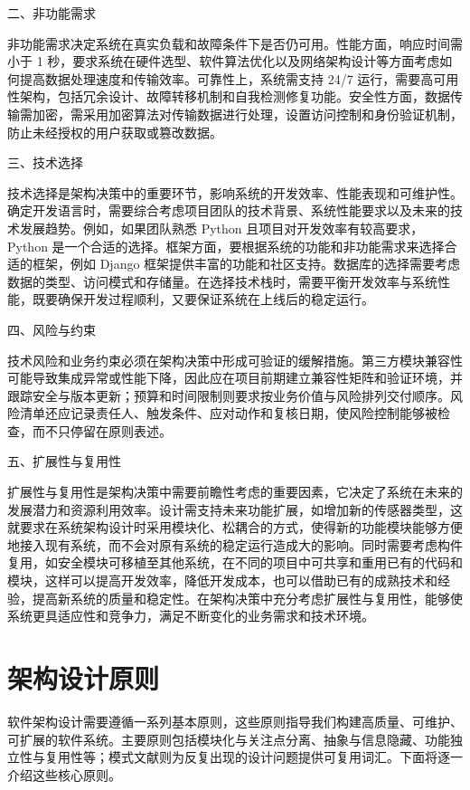 二、非功能需求

非功能需求决定系统在真实负载和故障条件下是否仍可用。性能方面，响应时间需小于 1 秒，要求系统在硬件选型、软件算法优化以及网络架构设计等方面考虑如何提高数据处理速度和传输效率。可靠性上，系统需支持 24/7 运行，需要高可用性架构，包括冗余设计、故障转移机制和自我检测修复功能。安全性方面，数据传输需加密，需采用加密算法对传输数据进行处理，设置访问控制和身份验证机制，防止未经授权的用户获取或篡改数据。

三、技术选择

技术选择是架构决策中的重要环节，影响系统的开发效率、性能表现和可维护性。确定开发语言时，需要综合考虑项目团队的技术背景、系统性能要求以及未来的技术发展趋势。例如，如果团队熟悉 Python 且项目对开发效率有较高要求，Python 是一个合适的选择。框架方面，要根据系统的功能和非功能需求来选择合适的框架，例如 Django 框架提供丰富的功能和社区支持。数据库的选择需要考虑数据的类型、访问模式和存储量。在选择技术栈时，需要平衡开发效率与系统性能，既要确保开发过程顺利，又要保证系统在上线后的稳定运行。

四、风险与约束

技术风险和业务约束必须在架构决策中形成可验证的缓解措施。第三方模块兼容性可能导致集成异常或性能下降，因此应在项目前期建立兼容性矩阵和验证环境，并跟踪安全与版本更新；预算和时间限制则要求按业务价值与风险排列交付顺序。风险清单还应记录责任人、触发条件、应对动作和复核日期，使风险控制能够被检查，而不只停留在原则表述。

五、扩展性与复用性

扩展性与复用性是架构决策中需要前瞻性考虑的重要因素，它决定了系统在未来的发展潜力和资源利用效率。设计需支持未来功能扩展，如增加新的传感器类型，这就要求在系统架构设计时采用模块化、松耦合的方式，使得新的功能模块能够方便地接入现有系统，而不会对原有系统的稳定运行造成大的影响。同时需要考虑构件复用，如安全模块可移植至其他系统，在不同的项目中可共享和重用已有的代码和模块，这样可以提高开发效率，降低开发成本，也可以借助已有的成熟技术和经验，提高新系统的质量和稳定性。在架构决策中充分考虑扩展性与复用性，能够使系统更具适应性和竞争力，满足不断变化的业务需求和技术环境。

\section{架构设计原则}

软件架构设计需要遵循一系列基本原则，这些原则指导我们构建高质量、可维护、可扩展的软件系统。主要原则包括模块化与关注点分离、抽象与信息隐藏、功能独立性与复用性等；模式文献则为反复出现的设计问题提供可复用词汇\cite{martin2017,gamma1994}。下面将逐一介绍这些核心原则。

